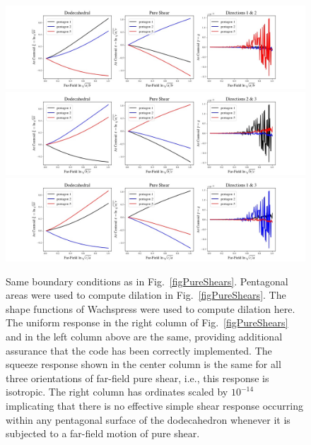\begin{figure}
	\centering
	\includegraphics[width=\textwidth]{figures/pentagonalPureShear12.jpg} \\
	\includegraphics[width=\textwidth]{figures/pentagonalPureShear23.jpg} \\
	\includegraphics[width=\textwidth]{figures/pentagonalPureShear13.jpg} \\
	\caption{Same boundary conditions as in Fig.~\ref{figPureShears}.  Pentagonal areas were used to compute dilation in Fig.~\ref{figPureShears}.  The shape functions of Wachspress were used to compute dilation here.  The uniform response in the right column of Fig.~\ref{figPureShears} and in the left column above are the same, providing additional assurance that the code has been correctly implemented.  The squeeze response shown in the center column is the same for all three orientations of far-field pure shear, i.e., this response is isotropic.  The right column has ordinates scaled by $10^{-14}$ implicating that there is no effective simple shear response occurring within any pentagonal surface of the dodecahedron whenever it is subjected to a far-field motion of pure shear.}
	\label{figPureShearsPentagons}
\end{figure}


